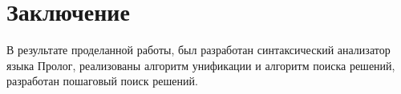 \chapter{Заключение}
В результате проделанной работы, был разработан синтаксический анализатор языка Пролог, реализованы алгоритм унификации и алгоритм поиска решений, разработан пошаговый поиск решений.